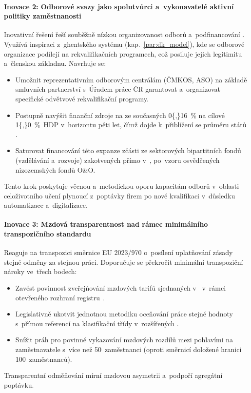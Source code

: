 \paragraph{Inovace 2: Odborové svazy jako spolutvůrci a~vykonavatelé aktivní politiky zaměstnanosti}\label{par:inovace_ghent}
Inovativní řešení řeší souběžně nízkou organizovanost odborů a~podfinancování . Využívá inspiraci z~ghentského systému (kap.~\ref{par:dk_model}), kde se odborové organizace podílejí na rekvalifikačních programech, což posiluje jejich legitimitu a~členskou základnu. Navrhuje se:
\begin{itemize}[noitemsep]
  \item Umožnit reprezentativním odborovým centrálám (\ac{ČMKOS}, ASO) na základě smluvních partnerství s~Úřadem práce ČR garantovat a~organizovat specifické odvětvové rekvalifikační programy.
  \item Postupně navýšit finanční zdroje na  ze současných \SI{0{,}16}{\percent} na cílové \SI{1{,}0}{\percent}~\acs{HDP} v~horizontu pěti let, čímž dojde k~přiblížení se průměru států .
  \item Saturovat financování této expanze zčásti ze sektorových bipartitních fondů (vzdělávání a~rozvoje) zakotvených přímo v~, po~vzoru osvědčených nizozemských fondů O\&O.
\end{itemize}
Tento krok poskytuje věcnou a~metodickou oporu kapacitám odborů v~oblasti celoživotního učení plynoucí z~poptávky firem po nové kvalifikaci v~důsledku automatizace a~digitalizace.\par

\paragraph{Inovace 3: Mzdová transparentnost nad rámec minimálního transpozičního standardu}\label{par:inovace_transparentnost}
Reaguje na transpozici směrnice EU 2023/970 o~posílení uplatňování zásady stejné odměny za stejnou práci. Doporučuje se překročit minimální transpoziční nároky ve~třech bodech:
\begin{itemize}[noitemsep]
  \item Zavést povinnost zveřejňování mzdových tarifů sjednaných v~ v~rámci otevřeného rozhraní registru .
  \item Legislativně ukotvit jednotnou metodiku oceňování práce stejné hodnoty s~přímou referencí na klasifikační třídy v~rozšířených .
  \item Snížit práh pro povinné vykazování mzdových rozdílů mezi pohlavími na zaměstnavatele s~více než 50~zaměstnanci (oproti směrnicí doložené hranici 100~zaměstnanců).
\end{itemize}
Transparentní odměňování mírní mzdovou asymetrii a~podpoří agregátní poptávku.\par


